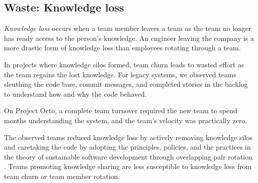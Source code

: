 
\subsection{Waste: Knowledge loss}
\textit{Knowledge loss} occurs when a team member leaves a team as the team no longer has ready access to the person's knowledge. An engineer leaving the company is a more drastic form of knowledge loss than employees rotating through a team. 

In projects where knowledge silos formed, team churn leads to wasted effort as the team regains the lost knowledge. For legacy systems, we observed teams sleuthing the code base, commit messages, and completed stories in the backlog to understand how and why the code behaved.  

On Project Octo, a complete team turnover required the new team to spend months understanding the system, and the team's velocity was practically zero.

The observed teams reduced knowledge loss by actively removing knowledge silos and caretaking the code by adopting the principles, policies, and the practices in the theory of sustainable software development through overlapping pair rotation \cite{SedanoSustainableSoftware}. Teams promoting knowledge sharing are less susceptible to knowledge loss from team churn or team member rotation. 

